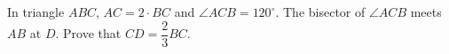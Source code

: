 In triangle $ABC$, $AC=2\cdot BC$ and $\angle ACB=120^\circ$. The bisector of $\angle ACB$ meets $AB$ at $D$. Prove that $CD=\dfrac23BC$.
